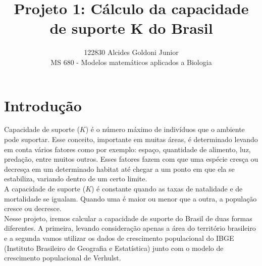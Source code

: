 \documentclass[a4paper]{article}
\title{Projeto 1: C\'{a}lculo da capacidade de suporte {K} do Brasil }
\author{122830 Alcides Goldoni Junior\\
  \small MS 680 - Modelos matem\'{a}ticos aplicados a Biologia\\
}%
\begin{document}
\maketitle
\abstract{}
\section{Introdu\c{c}\~{a}o}
Capacidade de suporte ($K$) \'{e} o n\'{u}mero m\'{a}ximo de indiv\'{i}duos que o ambiente pode suportar. Esse conceito, importante em muitas \'{a}reas, \'{e} determinado levando em conta v\'{a}rios fatores como por exemplo: espa\c{c}o, quantidade de alimento, luz, preda\c{c}\~{a}o, entre muitos outros. Esses fatores fazem com que uma esp\'{e}cie cres\c{c}a ou decres\c{c}a em um determinado habitat at\'{e} chegar a um ponto em que ela se estabiliza, variando dentro de um certo limite.
\\
A capacidade de suporte ($K$) \'{e} constante quando as taxas de natalidade e de mortalidade se igualam. Quando uma \'{e} maior ou menor que a outra, a popula\c{c}\~{a}o cresce ou decresce.
\\
Nesse projeto, iremos calcular a capacidade de suporte do Brasil de duas formas diferentes. A primeira, levando considera\c{c}\~{a}o apenas a \'{a}rea do territ\'{o}rio brasileiro e a segunda vamos utilizar os dados de crescimento populacional do IBGE (Instituto Brasileiro de Geografia e Estat\'{i}stica) junto com o modelo de crescimento populacional de Verhulst.
\\
\end{document}
